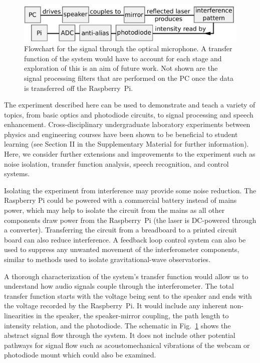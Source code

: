 \documentclass[paper-main.tex]{subfiles}
\begin{document}
\begin{figure}
    \includegraphics[width=.8\textwidth]{figures/pipeline_nobox.pdf}
	\caption{\label{fig:pipeline_highlighted}
Flowchart for the signal through the optical microphone. 
A transfer function of the system would have to account for each stage and exploration of this is an aim of future work. 
Not shown are the signal processing filters that are performed on the PC once the data is transferred off the Raspberry~Pi.
}
\end{figure}

The experiment described here can be used to demonstrate and teach a variety of topics, from basic optics and photodiode circuits, to signal processing and speech enhancement. 
Cross-disciplinary undergraduate laboratory experiments between physics and engineering courses have been shown to be beneficial to student learning (see Section II in the Supplementary Material for further information). 
Here, we consider further extensions and improvements to the experiment such as noise isolation, transfer function analysis, speech recognition, and control systems.



Isolating the experiment from interference may provide some noise reduction. 
The Raspberry Pi could be powered with a commercial battery instead of mains power, which may help to isolate the circuit from the mains as all other components draw power from the Raspberry~Pi (the laser is DC-powered through a converter).
Transferring the circuit from a breadboard to a printed circuit board can also reduce interference.\cite{elfekey2013design}
A feedback loop control system can also be used to suppress any unwanted movement of the interferometer components,\citep{abbott2017exploring, Sekiguchi:2016bmv, verhoeven2009robust} similar to methods used to isolate gravitational-wave observatories. 


A thorough characterization of the system's transfer function would allow us to understand how audio signals couple through the interferometer. 
The total transfer function starts with the voltage being sent to the speaker and ends with the voltage recorded by the Raspberry~Pi. 
It would include any inherent non-linearities in the speaker, the speaker-mirror coupling, the path length to intensity relation, and the photodiode. 
The schematic in Fig.~\ref{fig:pipeline_highlighted} shows the abstract signal flow through the system.
It does not include other potential pathways for signal flow such as acoustomechanical vibrations of the webcam or photodiode mount which could also be examined.
\end{document}
